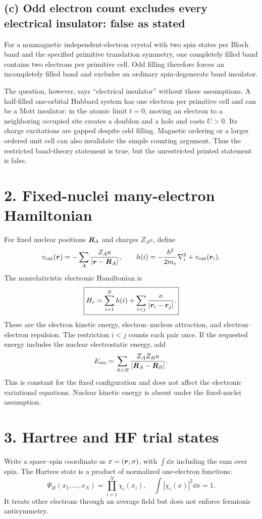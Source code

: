 \subsection*{(c) Odd electron count excludes every electrical insulator: false as stated}
For a nonmagnetic independent-electron crystal with two spin states per Bloch band and the specified primitive translation symmetry, one completely filled band contains two electrons per primitive cell. Odd filling therefore forces an incompletely filled band and excludes an ordinary spin-degenerate band insulator.

The question, however, says ``electrical insulator'' without these assumptions. A half-filled one-orbital Hubbard system has one electron per primitive cell and can be a Mott insulator: in the atomic limit $t=0$, moving an electron to a neighboring occupied site creates a doublon and a hole and costs $U>0$. Its charge excitations are gapped despite odd filling. Magnetic ordering or a larger ordered unit cell can also invalidate the simple counting argument. Thus the restricted band-theory statement is true, but the unrestricted printed statement is false.

\section*{2. Fixed-nuclei many-electron Hamiltonian}
For fixed nuclear positions $\boldsymbol{R}_A$ and charges $Z_Ae$, define
\[
v_{\rm ext}(\boldsymbol{r})=-\sum_A\frac{Z_A\kappa}{|\boldsymbol{r}-\boldsymbol{R}_A|},\qquad
h(i)=-\frac{\hbar^2}{2m_e}\nabla_i^2+v_{\rm ext}(\boldsymbol{r}_i).
\]
The nonrelativistic electronic Hamiltonian is
\[
\boxed{H_e=\sum_{i=1}^N h(i)+\sum_{i<j}\frac{\kappa}{|\boldsymbol{r}_i-\boldsymbol{r}_j|}.}
\]
These are the electron kinetic energy, electron--nucleus attraction, and electron--electron repulsion. The restriction $i<j$ counts each pair once. If the requested energy includes the nuclear electrostatic energy, add
\[
E_{nn}=\sum_{A<B}\frac{Z_AZ_B\kappa}{|\boldsymbol{R}_A-\boldsymbol{R}_B|}.
\]
This is constant for the fixed configuration and does not affect the electronic variational equations. Nuclear kinetic energy is absent under the fixed-nuclei assumption.

\section*{3. Hartree and HF trial states}
Write a space--spin coordinate as $x=(\boldsymbol{r},\sigma)$, with $\int\dd x$ including the sum over spin. The Hartree state is a product of normalized one-electron functions:
\[
\boxed{\Psi_H(x_1,\ldots,x_N)=\prod_{i=1}^N\chi_i(x_i),
\quad \int|\chi_i(x)|^2\dd x=1.}
\]
It treats other electrons through an average field but does not enforce fermionic antisymmetry.

